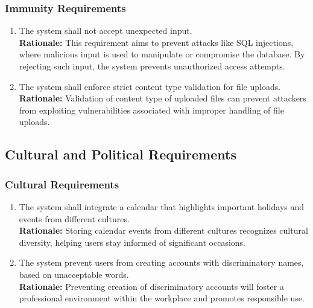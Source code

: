 \documentclass[]{article}
\begin{document}
\subsubsection{Immunity Requirements}
\label{ssub:immunity_requirements}
\begin{enumerate}[{SR-IM}1. ]
	\item The system shall not accept unexpected input. \\
	{\bf Rationale:} This requirement aims to prevent attacks like SQL injections, where malicious input is used to manipulate or compromise the database. By rejecting such input, the system prevents unauthorized
	access attempts.
	\item  The system shall enforce strict content type validation for file uploads. \\
	{\bf Rationale:} Validation of content type of uploaded files can prevent attackers from exploiting vulnerabilities associated with improper handling of file uploads.
\end{enumerate}




\subsection{Cultural and Political Requirements}
\label{sub:cultural_and_political_requirements}

\subsubsection{Cultural Requirements}
\label{ssub:cultural_requirements}
\begin{enumerate}[{CP-C}1. ]
	\item The system shall integrate a calendar that highlights important holidays and events from different cultures. \\
	{\bf Rationale:} Storing calendar events from different cultures recognizes cultural diversity, helping users stay informed 
	of significant occasions. 
	\item The system prevent users from creating accounts with discriminatory names, based on unacceptable words. \\
	{\bf Rationale:} Preventing creation of discriminatory accounts will foster a professional environment within the workplace and 
	promotes responsible use.
\end{enumerate}
\end{document}
